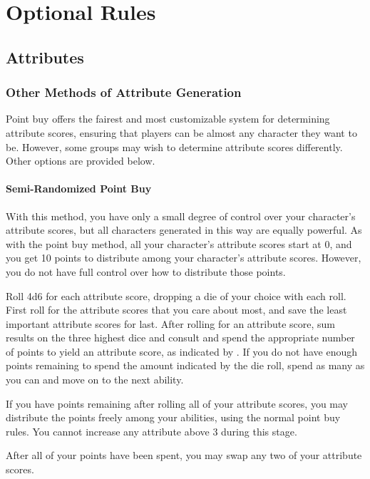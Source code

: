 \chapter{Optional Rules}

\section{Attributes}

\subsection{Other Methods of Attribute Generation}
Point buy offers the fairest and most customizable system for determining attribute scores, ensuring that players can be almost any character they want to be. However, some groups may wish to determine attribute scores differently. Other options are provided below.

\subsubsection{Semi-Randomized Point Buy}
With this method, you have only a small degree of control over your character's attribute scores, but all characters generated in this way are equally powerful. As with the point buy method, all your character's attribute scores start at 0, and you get 10 points to distribute among your character's attribute scores. However, you do not have full control over how to distribute those points.

Roll 4d6 for each attribute score, dropping a die of your choice with each roll. First roll for the attribute scores that you care about most, and save the least important attribute scores for last. After rolling for an attribute score, sum results on the three highest dice and consult  and spend the appropriate number of points to yield an attribute score, as indicated by . If you do not have enough points remaining to spend the amount indicated by the die roll, spend as many as you can and move on to the next ability.

If you have points remaining after rolling all of your attribute scores, you may distribute the points freely among your abilities, using the normal point buy rules. You cannot increase any attribute above 3 during this stage.

After all of your points have been spent, you may swap any two of your attribute scores.

